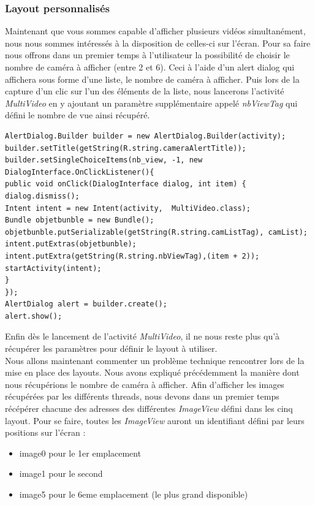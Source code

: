 \subsubsection{Layout personnalisés}
Maintenant que vous sommes capable d'afficher plusieurs vidéos simultanément,
nous nous sommes intéressés à la disposition de celles-ci sur l'écran.
Pour sa faire nous offrons dans un premier temps à l'utilisateur la possibilité
de choisir le nombre de caméra à afficher (entre 2 et 6).\newline
Ceci à l'aide d'un alert dialog qui affichera sous forme d'une liste, le nombre
de caméra à afficher. Puis lors de la capture d'un clic sur l'un des éléments de
la liste, nous lancerons l'activité \textit{MultiVideo} en y ajoutant un
paramètre supplémentaire appelé \textit{nbViewTag} qui défini le nombre de vue
ainsi récupéré.
\begin{changemargin}{0cm}{0cm}
\begin{lstlisting}[caption={Multi-Video launcher}] 
AlertDialog.Builder builder = new AlertDialog.Builder(activity);
builder.setTitle(getString(R.string.cameraAlertTitle));
builder.setSingleChoiceItems(nb_view, -1, new DialogInterface.OnClickListener(){ 
public void onClick(DialogInterface dialog, int item) {
dialog.dismiss();
Intent intent = new Intent(activity,  MultiVideo.class);
Bundle objetbunble = new Bundle();
objetbunble.putSerializable(getString(R.string.camListTag), camList);
intent.putExtras(objetbunble);
intent.putExtra(getString(R.string.nbViewTag),(item + 2));
startActivity(intent);
}
});
AlertDialog alert = builder.create();
alert.show();
\end{lstlisting}    
\end{changemargin}
Enfin dès le lancement de l'activité \textit{MultiVideo}, il ne nous reste plus
qu'à récupérer les paramètres pour définir le layout à utiliser.\\
\newline\indent Nous allons maintenant commenter un problème technique
rencontrer lors de la mise en place des layouts.
Nous avons expliqué précédemment la manière dont nous récupérions le nombre de
caméra à afficher. Afin d'afficher les images récupérées par les différents
threads, nous devons dans un premier temps récépérer chacune des adresses des
différentes \textit{ImageView} défini dans les cinq layout. \newline Pour se
faire, toutes les \textit{ImageView} auront un identifiant défini par leurs
positions sur l'écran :
\begin{itemize}
\item image0 pour le 1er emplacement
\item image1 pour le second
\item image5 pour le 6eme emplacement (le plus grand disponible)
\end{itemize}
